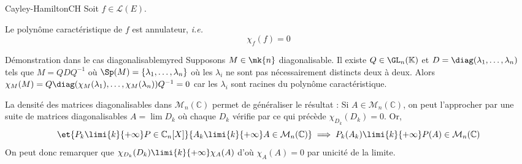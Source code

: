 \begin{theo}{Cayley-Hamilton}{CH}
        Soit $f \in \mathcal{L}(E)$.

        Le polynôme caractéristique de $f$ est annulateur, \textit{i.e.} 
        \[ \chi_f(f) = 0 \]
\end{theo}

    \begin{demo}{Démonstration dans le cas diagonalisable}{myred}
        Supposons $M \in \mk{n}$ diagonalisable. Il existe $Q \in \GL_n(\mathbb{K})$ et $D = \diag(\lambda_1,\ldots,\lambda_n)$ tels que $M = Q D Q^{-1}$ où $\Sp(M) = \left\{\lambda_1,\ldots,\lambda_n\right\}$ où les $\lambda_i$ ne sont pas nécessairement distincts deux à deux. Alors $\chi_M(M) = Q \diag(\chi_M(\lambda_1), \ldots, \chi_M(\lambda_n)) Q^{-1} = 0$ car les $\lambda_i$ sont racines du polynôme caractéristique.

        La densité des matrices diagonalisables dans $\mathcal{M}_n(\mathbb{C})$ permet de généraliser le résultat : Si $A \in \mathcal{M}_n(\mathbb{C})$, on peut l’approcher par une suite de matrices diagonalisables $A = \lim D_k$ où chaque $D_k$ vérifie par ce qui précède $\chi_{D_k}(D_k) = 0$. Or, 
        \[ \et{P_k \limi{k}{+\infty} P \in \mathbb{C}_n[X]}{A_k \limi{k}{+\infty} A \in \mathcal{M}_n(\mathbb{C})} \implies P_k(A_k) \limi{k}{+\infty} P(A) \in \mathcal{M}_n(\mathbb{C}) \]    
        On peut donc remarquer que $\chi_{D_k}(D_k) \limi{k}{+\infty} \chi_A(A)$ d’où $\chi_A(A) = 0$ par unicité de la limite.
    \end{demo}

